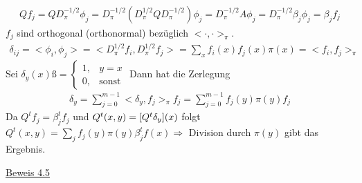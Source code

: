 \begin{beweis}
\begin{beweis}
		\begin{align}
			Qf_j = Q D^{-1/2}_{\pi} \phi_j = D^{-1/2}_\pi (D^{1/2}_\pi Q D^{-1/2}_{\pi}) \phi_j = D^{-1/2}_{\pi} A \phi_j = D^{-1/2}_{\pi} \beta_j \phi_j = \beta_j f_j
		\end{align}
		$f_j$ sind orthogonal (orthonormal) bezüglich $<\cdot,\cdot>_{\pi}$.
		\begin{align}
			\delta_{ij} = <\phi_i,\phi_j> = <D^{1/2}_{\pi} f_i, D_{\pi}^{1/2} f_j > = \sum\limits_{x} f_i(x) f_j(x) \pi(x) = <f_i,f_j>_{\pi}
		\end{align}
		Sei $\delta_y(x)ß = \begin{cases}
			1, &y = x \\
			0, &\text{sonst}
		\end{cases}$ Dann hat die Zerlegung 
		\begin{align}
			\delta_y = \sum\limits_{j = 0}^{m-1} <\delta_y,f_j>_{\pi} f_j = \sum\limits_{j = 0}^{m-1} f_j(y) \pi(y) f_j
		\end{align}
		Da $Q^t f_j = \beta^t_j f_j$ und $Q^t(x,y) = \benb{Q^t\delta_y} (x)$ folgt $Q^t(x,y) = \sum\limits_{j}f_j(y) \pi(y) \beta_j^t f(x) \Rightarrow $ Division durch $\pi(y)$ gibt das Ergebnis.
	\end{beweis}
	\underline{Beweis 4.5} 
	

\end{beweis}
